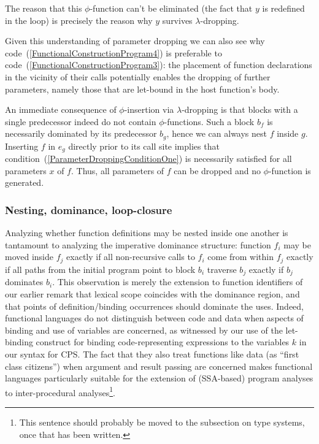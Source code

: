 The reason that this $\phi$-function can't be eliminated (the fact
that $y$ is redefined in the loop) is precisely the reason why $y$
survives $\lambda$-dropping.

Given this understanding of parameter dropping we can also see why
code~(\ref{FunctionalConstructionProgram4}) is preferable to
code~(\ref{FunctionalConstructionProgram3}): the placement of function
declarations in the vicinity of their calls potentially enables the
dropping of further parameters, namely those that are let-bound in the
host function's body.

An immediate consequence of $\phi$-insertion via $\lambda$-dropping is
that blocks with a single predecessor indeed do not contain
$\phi$-functions. Such a block $b_f$ is necessarily dominated by its
predecessor $b_g$, hence we can always nest $f$ inside $g$. Inserting
$f$ in $e_g$ directly prior to its call site implies that
condition~(\ref{ParameterDroppingConditionOne}) is necessarily
satisfied for all parameters $x$ of $f$. Thus, all parameters of $f$
can be dropped and no $\phi$-function is generated.

\subsubsection{Nesting, dominance, loop-closure}

Analyzing whether function definitions may be nested inside one
another is tantamount to analyzing the imperative dominance structure:
function $f_i$ may be moved inside $f_j$ exactly if all non-recursive
calls to $f_i$ come from within $f_j$ exactly if all paths from the
initial program point to block $b_i$ traverse $b_j$ exactly if $b_j$
dominates $b_i$.  This observation is merely the extension to function
identifiers of our earlier remark that lexical scope coincides with
the dominance region, and that points of definition/binding
occurrences should dominate the uses. Indeed, functional languages do
not distinguish between code and data when aspects of binding and use
of variables are concerned, as witnessed by our use of the let-binding
construct for binding code-representing expressions to the variables
$k$ in our syntax for CPS. The fact that they also treat functions
like data (as ``first class citizens'') when argument and result
passing are concerned makes functional languages particularly suitable
for the extension of (SSA-based) program analyses to inter-procedural
analyses\footnote{This sentence should probably be moved to the
subsection on type systems, once that has been written.}.

